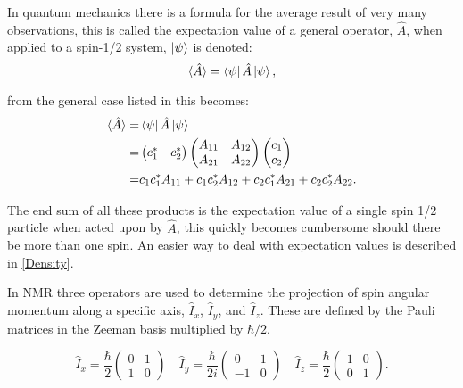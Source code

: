 In quantum mechanics there is a formula for the average result of very many observations, this is
called the expectation value of a general operator, $\hat{A}$, when applied to a spin-1/2 system, $\ket{\psi}$
is denoted:
\begin{equation}
  \langle\hat{A}\rangle = \bra{\psi}\hat{A}\ket{\psi},
\end{equation}

from the general case listed in  this becomes:
\begin{align}\label{eqn:expectation}
  \langle\hat{A}\rangle =& \bra{\psi}\hat{A}\ket{\psi}\\
  =& \begin{pmatrix}
    c_1^* & c_2^*
\end{pmatrix}
\begin{pmatrix}
A_{11} & A_{12}\\
A_{21} & A_{22}
\end{pmatrix}
\begin{pmatrix}
  c_1\\
  c_2
\end{pmatrix}\\
=& c_1c_1^*A_{11} + c_1c_2^*A_{12} + c_2c_1^*A_{21} + c_2c_2^*A_{22}.
\end{align}

The end sum of all these products is the expectation value of a single spin 1/2 particle when
acted upon by $\hat{A}$, this quickly becomes cumbersome should there be more than one spin. An easier
way to deal with expectation values is described in \ref{Density}.

In NMR three operators are used to determine the projection of spin angular momentum along a
specific axis, $\hat{I}_x$, $\hat{I}_y$, and $\hat{I}_z$. These are defined by the
Pauli matrices in the Zeeman basis multiplied by $\hbar/2$.

\begin{equation}
  \hat{I}_x=\frac{\hbar}{2}\begin{pmatrix}
    0 & 1\\
    1 & 0
\end{pmatrix}\quad
\hat{I}_y=\frac{\hbar}{2i}\begin{pmatrix}
  0 & 1\\
  -1 & 0
\end{pmatrix}\quad
\hat{I}_z=\frac{\hbar}{2}\begin{pmatrix}
  1 & 0\\
  0 & 1
\end{pmatrix}.
\end{equation}

